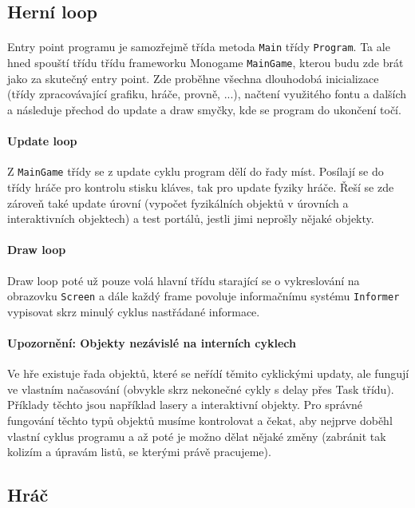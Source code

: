 \documentclass[a4paper, 12pt]{article}
\begin{document}
\subsection{Herní loop}
\paragraph{}
Entry point programu je samozřejmě třída metoda \texttt{Main} třídy
\texttt{Program}. Ta ale hned spouští třídu třídu frameworku Monogame
\texttt{MainGame}, kterou budu zde brát jako za skutečný entry point. Zde
proběhne všechna dlouhodobá inicializace (třídy zpracovávající grafiku, hráče,
provně, ...), načtení využitého fontu a dalších a následuje přechod do update a
draw smyčky, kde se program do ukončení točí. 

\paragraph{Update loop}
Z \texttt{MainGame} třídy se z update cyklu program dělí do řady míst. Posílají
se do třídy hráče pro kontrolu stisku kláves, tak pro update fyziky hráče. Řeší
se zde zároveň také update úrovní (vypočet fyzikálních objektů v úrovních a
interaktivních objektech) a test portálů, jestli jimi neprošly nějaké objekty.

\paragraph{Draw loop}
Draw loop poté už pouze volá hlavní třídu starající se o vykreslování na
obrazovku \texttt{Screen} a dále každý frame povoluje informačnímu systému
\texttt{Informer} vypisovat skrz minulý cyklus nastřádané informace.

\paragraph{Upozornění: Objekty nezávislé na interních cyklech}
Ve hře existuje řada objektů, které se neřídí těmito cyklickými updaty, ale
fungují ve vlastním načasování (obvykle skrz nekonečné cykly s delay přes Task
třídu). Příklady těchto jsou například lasery a interaktivní objekty. Pro
správné fungování těchto typů objektů musíme kontrolovat a čekat, aby nejprve
doběhl vlastní cyklus programu a až poté je možno dělat nějaké změny (zabránit
tak kolizím a úpravám listů, se kterými právě pracujeme).

\subsection{Hráč}
\end{document}

